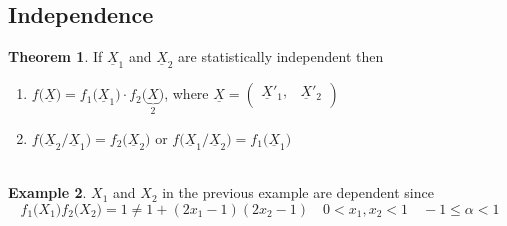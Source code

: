 \documentclass[11pt,a4paper]{article}
\theoremstyle{definition}
\newtheorem{thm}{Theorem}[section]
\newtheorem{exa}[thm]{Example}
\begin{document}
\subsection{Independence}
\begin{thm}
If $\underline{X}_1$  and $\underline{X}_2$ are statistically independent then 
\begin{enumerate}
\item $f\big(\underline{X}\big) = f_1\big(\underline{X}_1\big)\cdot f_2\big(\underbrace{X}_2\big)$, where $\underline{X} =\begin{pmatrix}
\underline{X}'_1, & \underline{X}'_2\\
\end{pmatrix}$

\item $f\Big(\underline{X}_2/\underline{X}_1\Big) = f_2\big(\underline{X}_2\big)$ or $f\Big(\underline{X}_1/\underline{X}_2\Big) =f_1\big(\underline{X}_1\big)$\\\\
\end{enumerate}
\end{thm}


\begin{exa}
$X_1$ and $X_2$ in the previous example are dependent since $$f_1\big(X_1\big)f_2\big(X_2\big) = 1 \neq 1 + (2x_1-1)(2x_2-1)\quad  0<x_1,x_2<1\quad  -1\leq \alpha < 1$$\\\\
\end{exa}
\end{document}
